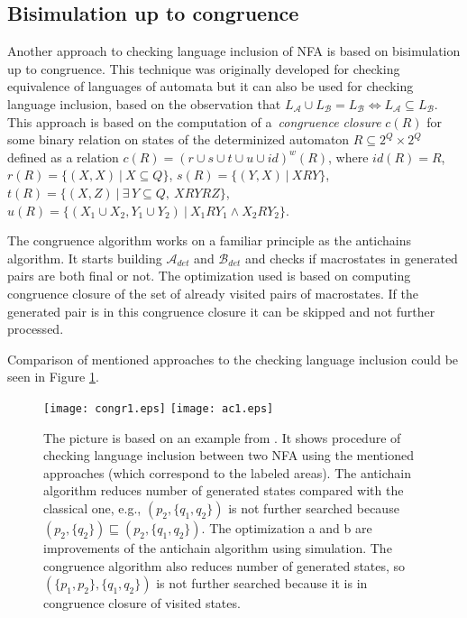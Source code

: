 \documentclass{eeict}
\begin{document}
\subsection{Bisimulation up to congruence}
Another approach to checking language inclusion of NFA is based on bisimulation up to congruence. This technique was originally developed for
checking equivalence of languages of automata but it can
also be used for checking language inclusion, based on the observation that $L_\mathcal{A}\cup L_\mathcal{B}= L_\mathcal{B} 
\Leftrightarrow L_\mathcal{A}\subseteq L_\mathcal{B}$. 
This approach is based on the computation of a~\emph{congruence closure} $c(R)$ 
for some binary relation on states of the determinized automaton $R \subseteq 2^Q\times 2^Q$ defined 
as a relation $c(R)=(r\cup s\cup t \cup u\cup id)^{w}(R)$, where $id(R)=R$, 
$r(R)=\{(X,X)\ |\ X\subseteq Q\}$, 
$s(R)=\{(Y,X)\ |\ XRY\}$,\linebreak
$t(R)=\{(X,Z)\ |\ \exists\,Y\subseteq Q,\ XRYRZ\}$,
$u(R)=\{(X_1 \cup X_2,Y_1\cup Y_2)\ |\ X_1 R Y_1 \wedge X_2 R Y_2\}$. 

The congruence algorithm works on a familiar principle as the antichains algorithm. 
It starts building $\mathcal{A}_{det}$ and $\mathcal{B}_{det}$ and checks if macrostates in generated pairs are both
final or not. The optimization used is based on computing congruence closure of the set of already visited pairs of macrostates. 
If the generated pair is in this congruence closure it can be skipped and not further processed.

Comparison of mentioned approaches to the checking language inclusion could be seen in Figure \ref{automata}.
\begin{figure}[bht]
\begin{center}
	\scalebox{1}
	{
		\texttt{[image: congr1.eps]}
		\hspace{0.55cm}
  	\texttt{[image: ac1.eps]}
	}
  \caption{
      \rm{
      \hspace{0.1cm} The picture is based on an example from \cite{tacas10}.
      It shows procedure of checking language inclusion between two NFA using the mentioned approaches (which correspond to the labeled areas).
      The antichain algorithm reduces number of generated states compared with the classical one,
      e.g., $(p_2,\{q_1,q_2\})$ is not further searched because $(p_2,\{q_2\}) \sqsubseteq (p_2,\{q_1,q_2\})$. 
      The optimization a and b are improvements of the antichain algorithm using simulation. 
      The congruence algorithm also reduces number of generated states, so $(\{p_1,p_2\},\{q_1,q_2\})$ is not further searched because it is in congruence closure 
      of visited states.}}
  \label{automata}
\end{center}
\end{figure}
\end{document}
